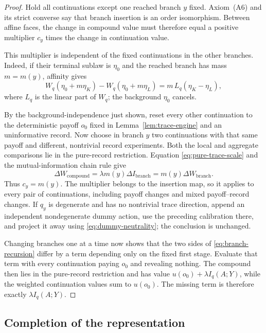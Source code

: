 \documentclass[11pt,a4paper]{article}
\theoremstyle{definition}
\newcommand{\1}{\mathbf 1}
\begin{document}
\begin{proof}
Hold all continuations except one reached branch $y$ fixed.  Axiom~\textup{(A6)} and its strict converse say that
branch insertion is an order isomorphism.  Between affine faces, the change in compound value must therefore equal a
positive multiplier $c_y$ times the change in continuation value.

This multiplier is independent of the fixed continuations in the other branches.  Indeed, if their terminal sublaw is
$\eta_0$ and the reached branch has mass $m=m(y)$, affinity gives
\[
 W_q(\eta_0+m\eta_K)-W_q(\eta_0+m\eta_L)
 =m\,L_q(\eta_K-\eta_L),
\]
where $L_q$ is the linear part of $W_q$; the background $\eta_0$ cancels.

By the background-independence just shown, reset every other continuation to the deterministic payoff $o_0$ fixed in
Lemma~\ref{lem:trace-engine} and an uninformative record.  Now choose in branch $y$ two continuations with that same
payoff and different, nontrivial
record experiments.  Both the local and aggregate comparisons lie in the pure-record restriction.  Equation
\eqref{eq:pure-trace-scale} and the
mutual-information chain rule give
\[
 \Delta W_{\mathrm{compound}}
 =\lambda m(y)\Delta I_{\mathrm{branch}}
 =m(y)\Delta W_{\mathrm{branch}}.
\]
Thus $c_y=m(y)$.  The multiplier belongs to the insertion map, so it applies to every pair of continuations, including
payoff changes and mixed payoff--record changes.  If $q_y$ is degenerate and has no nontrivial trace direction, append
an independent nondegenerate dummy action, use the preceding calibration there, and project it away using
\eqref{eq:dummy-neutrality}; the conclusion is unchanged.

Changing branches one at a time now shows that the two sides of \eqref{eq:branch-recursion} differ by a term depending
only on the fixed first stage.  Evaluate that term with every continuation paying $o_0$ and revealing nothing.
The compound then lies in the pure-record restriction and has value $u(o_0)+\lambda I_q(A;Y)$, while the weighted
continuation values sum to $u(o_0)$.  The missing term is therefore exactly $\lambda I_q(A;Y)$.
\end{proof}

\subsection{Completion of the representation}
\end{document}
